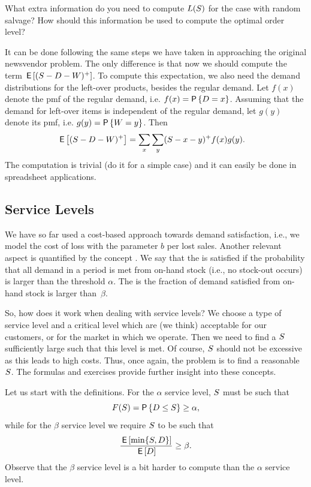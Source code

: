 \begin{exercise}[Continuation]
What extra information do you need to compute $L(S)$ for the case with random salvage? How should this information be used to compute the optimal order level?
\begin{solution}
It can be done following the same steps we have taken in approaching the original newsvendor problem. The only difference is that now we should compute the term $\,\mathsf{E}\left[(S-D-W)^+\right]$. 
To compute this expectation, we also need the demand distributions for the left-over  products, besides the regular demand. Let $f(x)$ denote the pmf of the regular demand, i.e. $f(x)=\P{D=x}$. Assuming that the demand for left-over items is independent of the regular demand, let $g(y)$ denote its pmf, i.e. $g(y)=\P{W=y}$. Then
\begin{align*}
\,\mathsf{E}\left[(S-D-W)^+\right] & = \sum_x \sum_y (S-x-y)^+ f(x) g(y).
\end{align*}
The computation is trivial (do it for a simple case) and it can easily be done in spreadsheet applications.
\end{solution}
\end{exercise}


\subsection{Service Levels}

We have so far used a cost-based approach towards demand satisfaction, i.e., we model the cost of loss with the parameter $b$ per lost sales. Another relevant aspect  is quantified by the concept . 
We say that the  is satisfied if the probability that all demand in a period is met from on-hand stock (i.e., no stock-out occurs) is larger than the threshold $\alpha$.  The  is the fraction of demand satisfied from on-hand stock is larger than~$\beta$. 

So, how does it work when dealing with service levels? We choose a type of service level and  a critical level which are (we think) acceptable for our customers, or for the market in which we operate. Then we need to find a $S$ sufficiently large such that this level is met. Of course, $S$ should not be excessive as this leads to high costs. Thus, once again, the problem is to find a reasonable $S$. The formulas and exercises provide further insight into these concepts.

Let us start with the definitions. For the $\alpha$ service level, $S$ must be such  that
\begin{equation}\label{eq:26}
  F(\Q) = \P{D\leq \Q} \geq \alpha,
\end{equation}
while for the  $\beta$ service level we require $S$ to be  such that
\begin{align}\label{eq:25}
\frac{\,\mathsf{E}\left[\min\{S, D\}\right]}{\,\mathsf{E}\left[D\right]} \geq \beta.
\end{align}
Observe that the $\beta$ service level is a bit harder to compute than the $\alpha$ service level.

